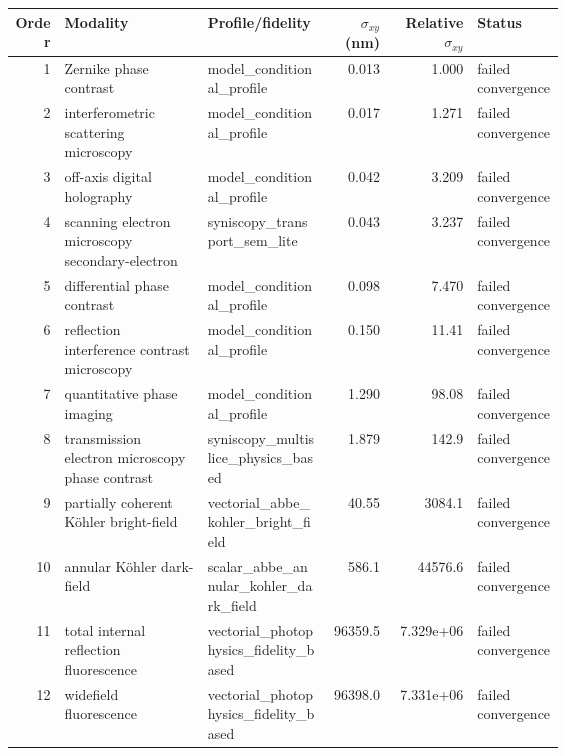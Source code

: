 \begin{tabular}{r p{0.26\linewidth} p{0.22\linewidth} r r p{0.16\linewidth}}
\toprule
Order & Modality & Profile/fidelity & $\sigma_{xy}$ (nm) & Relative $\sigma_{xy}$ & Status \\
\midrule
1 & Zernike phase contrast & model\_conditional\_profile & 0.013 & 1.000 & failed convergence \\
2 & interfero\allowbreak{}metric scattering microscopy & model\_conditional\_profile & 0.017 & 1.271 & failed convergence \\
3 & off-axis digital holography & model\_conditional\_profile & 0.042 & 3.209 & failed convergence \\
4 & scanning electron microscopy secondary-electron & syniscopy\_transport\_sem\_lite & 0.043 & 3.237 & failed convergence \\
5 & differential phase contrast & model\_conditional\_profile & 0.098 & 7.470 & failed convergence \\
6 & reflection interference contrast microscopy & model\_conditional\_profile & 0.150 & 11.41 & failed convergence \\
7 & quantitative phase imaging & model\_conditional\_profile & 1.290 & 98.08 & failed convergence \\
8 & transmission electron microscopy phase contrast & syniscopy\_multislice\_physics\_based & 1.879 & 142.9 & failed convergence \\
9 & partially coherent Köhler bright-field & vectorial\_abbe\_kohler\_bright\_field & 40.55 & 3084.1 & failed convergence \\
10 & annular Köhler dark-field & scalar\_abbe\_annular\_kohler\_dark\_field & 586.1 & 44576.6 & failed convergence \\
11 & total internal reflection fluorescence & vectorial\_photophysics\_fidelity\_based & 96359.5 & 7.329e+06 & failed convergence \\
12 & widefield fluorescence & vectorial\_photophysics\_fidelity\_based & 96398.0 & 7.331e+06 & failed convergence \\
\bottomrule
\end{tabular}
